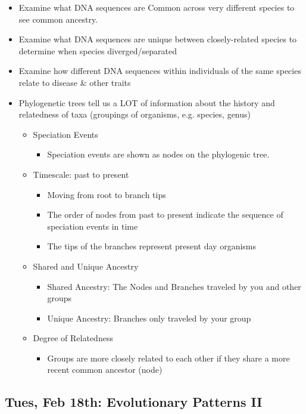 \documentclass[10pt, oneside]{article}
\begin{document}
\begin{itemize}

\item Examine what DNA sequences are Common across very different species to see common ancestry.
\item Examine what DNA sequences are unique between closely-related species to determine when species diverged/separated
\item Examine how different DNA sequences within individuals of the same species relate to disease \& other traits
\item Phylogenetic trees tell us a LOT of information about the history and relatedness of taxa (groupings of organisms, e.g. species, genus)
\begin{itemize}
\item Speciation Events
\begin{itemize}
\item Speciation events are shown as nodes on the phylogenic tree.
\end{itemize}
\item Timescale: past to present
\begin{itemize}
\item Moving from root to branch tips
\item The order of nodes from past to present indicate the sequence of speciation events in time
\item The tips of the branches represent present day organisms
\end{itemize}
\item Shared and Unique Ancestry
\begin{itemize}
\item Shared Ancestry: The Nodes and Branches traveled by you and other groups
\item Unique Ancestry: Branches only traveled by your group
\end{itemize}
\item Degree of Relatedness
\begin{itemize}
\item Groups are more closely related to each other if they share a more recent common ancestor (node)
\end{itemize}
\end{itemize}
\end{itemize}

\subsection{Tues, Feb 18th: Evolutionary Patterns II}
\end{document}
